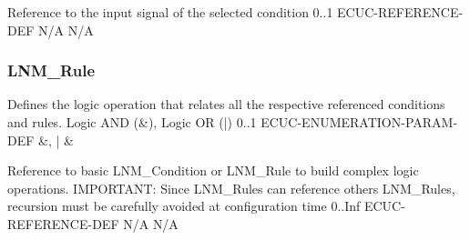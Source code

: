 {Reference to the input signal of the selected condition}
{0..1}
{ECUC-REFERENCE-DEF}
{N/A}
{N/A}


\subsubsection{LNM_Rule}


{Defines the logic operation that relates all the respective referenced conditions and rules. Logic AND (\&), Logic OR (|)}
{0..1}
{ECUC-ENUMERATION-PARAM-DEF}
{\&, |}
{\&}


{Reference to basic LNM_Condition or LNM_Rule to build complex logic operations. IMPORTANT: Since LNM_Rules can reference others LNM_Rules, recursion must be carefully avoided at configuration time}
{0..Inf}
{ECUC-REFERENCE-DEF}
{N/A}
{N/A}



